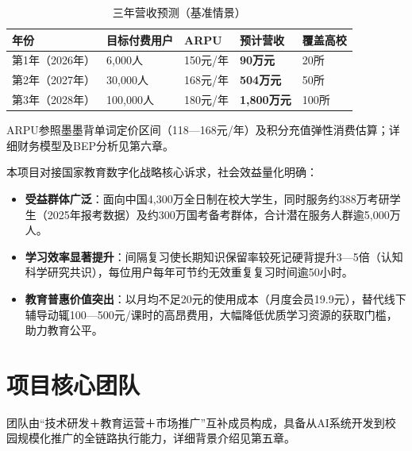 \begin{table}[htbp]
  \centering
  \caption{三年营收预测（基准情景）}
  \label{tab:revenue}
  \begin{tabular}{lllll}
    \toprule
    \textbf{年份}       & \textbf{目标付费用户} & \textbf{ARPU}  & \textbf{预计营收}   & \textbf{覆盖高校} \\
    \midrule
    第1年（2026年）     & 6,000人              & 150元/年       & \textbf{90万元}     & 20所              \\
    第2年（2027年）     & 30,000人             & 168元/年       & \textbf{504万元}    & 50所              \\
    第3年（2028年）     & 100,000人            & 180元/年       & \textbf{1,800万元}  & 100所             \\
    \bottomrule
  \end{tabular}
  \begin{flushleft}
    \footnotesize ARPU参照墨墨背单词定价区间（118—168元/年）及积分充值弹性消费估算；详细财务模型及BEP分析见第六章。
  \end{flushleft}
\end{table}

本项目对接国家教育数字化战略核心诉求，社会效益量化明确：

\begin{itemize}[leftmargin=2em]
  \item \textbf{受益群体广泛}：面向中国4,300万全日制在校大学生，同时服务约388万考研学生（2025年报考数据）及约300万国考备考群体，合计潜在服务人群逾5,000万人。
  \item \textbf{学习效率显著提升}：间隔复习使长期知识保留率较死记硬背提升3—5倍（认知科学研究共识），每位用户每年可节约无效重复复习时间逾50小时。
  \item \textbf{教育普惠价值突出}：以月均不足20元的使用成本（月度会员19.9元），替代线下辅导动辄100—500元/课时的高昂费用，大幅降低优质学习资源的获取门槛，助力教育公平。
\end{itemize}

\section{项目核心团队}

团队由“技术研发＋教育运营＋市场推广”互补成员构成，具备从AI系统开发到校园规模化推广的全链路执行能力，详细背景介绍见第五章。

